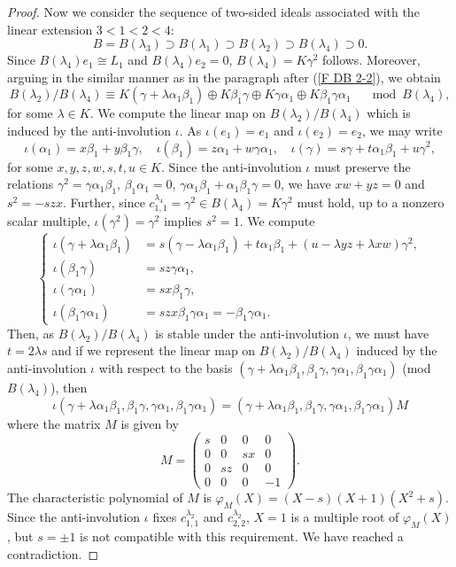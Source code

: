 \documentclass[12pt]{amsart}
\numberwithin{equation}{thm}
\begin{document}
{\begin{proof}
Now we consider the sequence of two-sided ideals associated with the linear extension $3<1<2<4$:
\[
B=B(\lambda_3) \supset B(\lambda_1) \supset B(\lambda_2) \supset B(\lambda_4) \supset 0.
\]
Since $B(\lambda_4)e_1\cong L_1$ and $B(\lambda_4)e_2=0$, $B(\lambda_4)=K\gamma^2$ follows. 
Moreover, arguing in the similar manner as in the paragraph after (\ref{F DB 2-2}), we obtain 
\[ 
B(\lambda_2)/B(\lambda_4)\equiv  
K(\gamma+\lambda\alpha_1\beta_1)\oplus K\beta_1\gamma \oplus K\gamma\alpha_1\oplus K\beta_1\gamma\alpha_1
\quad \mod B(\lambda_4), 
\]
for some $\lambda\in K$. We compute the linear map on $B(\lambda_2)/B(\lambda_4)$ which is induced by 
the anti-involution $\iota$. As $\iota(e_1)=e_1$ and $\iota(e_2)=e_2$, we may write
\[
\iota(\alpha_1)=x\beta_1+y\beta_1\gamma, \quad \iota(\beta_1)=z\alpha_1+w\gamma\alpha_1, \quad 
\iota(\gamma)=s\gamma+t\alpha_1\beta_1+u\gamma^2,
\]
for some $x,y,z,w,s,t,u\in K$. Since the anti-involution $\iota$ must preserve the relations 
$\gamma^2=\gamma\alpha_1\beta_1$, $\beta_1\alpha_1=0$, $\gamma\alpha_1\beta_1+\alpha_1\beta_1\gamma=0$, 
we have $xw+yz=0$ and $s^2=-szx$. Further, since $c^{\lambda_4}_{1,1}=\gamma^2 \in B(\lambda_4)=K\gamma^2$ must hold, up to a nonzero 
scalar multiple, $\iota(\gamma^2)=\gamma^2$ implies $s^2=1$. We compute
\[
\begin{cases}
\iota(\gamma+\lambda\alpha_1\beta_1) &= s(\gamma-\lambda\alpha_1\beta_1)+t\alpha_1\beta_1+(u-\lambda yz+\lambda xw)\gamma^2,\\
\iota(\beta_1\gamma) &= sz\gamma\alpha_1, \\
\iota(\gamma\alpha_1) &= sx\beta_1\gamma, \\
\iota(\beta_1\gamma\alpha_1) &= szx\beta_1\gamma\alpha_1 = -\beta_1\gamma\alpha_1.
\end{cases}
\]
Then, as $B(\lambda_2)/B(\lambda_4)$ is stable under the anti-involution $\iota$, we must have $t=2\lambda s$ and if we 
represent the linear map on $B(\lambda_2)/B(\lambda_4)$ induced by the anti-involution $\iota$ with respect to 
the basis $(\gamma+\lambda\alpha_1\beta_1, \beta_1\gamma, \gamma\alpha_1, \beta_1\gamma\alpha_1)$ ({\rm mod} $B(\lambda_4)$), then 
\[
\iota(\gamma+\lambda\alpha_1\beta_1, \beta_1\gamma, \gamma\alpha_1, \beta_1\gamma\alpha_1)
=(\gamma+\lambda\alpha_1\beta_1, \beta_1\gamma, \gamma\alpha_1, \beta_1\gamma\alpha_1)M
\]
where the matrix $M$ is given by
\[
M=\begin{pmatrix}
s & 0 & 0 & 0 \\
0 & 0 & sx & 0 \\
0 & sz & 0 & 0 \\
0 & 0 & 0 & -1 \end{pmatrix}.
\]
The characteristic polynomial of $M$ is $\varphi_M(X)=(X-s)(X+1)(X^2+s)$. Since the anti-involution $\iota$ 
fixes $c^{\lambda_2}_{1,1}$ and $c^{\lambda_2}_{2,2}$, $X=1$ is a multiple root of $\varphi_M(X)$, 
but $s=\pm 1$ is not compatible with this requirement. We have reached a contradiction. 
\end{proof}


}
\end{document}
